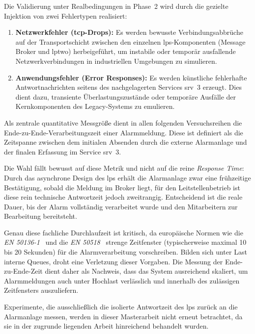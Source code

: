 Die Validierung unter Realbedingungen in Phase~2 wird durch die gezielte Injektion von zwei Fehlertypen realisiert:
\begin{enumerate}
    \item \textbf{Netzwerkfehler (\gls{tcp}-Drops):} Es werden bewusste Verbindungsabbrüche auf der Transportschicht zwischen den einzelnen \gls{lps}-Kom\-po\-nen\-ten (Message Broker und \gls{lptwo}) herbeigeführt, um instabile oder temporär ausfallende Netzwerkverbindungen in industriellen Umgebungen zu simulieren.

    \item \textbf{Anwendungsfehler (Error Responses):} Es werden künstliche fehlerhafte Antwortnachrichten seitens des nachgelagerten Services \gls{srv}~3 erzeugt. Dies dient dazu, transiente Überlastungszustände oder temporäre Ausfälle der Kernkomponenten des Legacy-Systems zu emulieren.
\end{enumerate}

Als zentrale quantitative Messgröße dient in allen folgenden Versuchsreihen die Ende-zu-Ende-Verarbeitungszeit einer Alarmmeldung. Diese ist definiert als die Zeitspanne zwischen dem initialen Absenden durch die externe Alarmanlage und der finalen Erfassung im Service \gls{srv}~3.

Die Wahl fällt bewusst auf diese Metrik und nicht auf die reine \textit{Response Time}: Durch das asynchrone Design des \gls{lps} erhält die Alarmanlage zwar eine frühzeitige Bestätigung, sobald die Meldung im Broker liegt, für den Leitstellenbetrieb ist diese rein technische Antwortzeit jedoch zweitrangig. Entscheidend ist die reale Dauer, bis der Alarm vollständig verarbeitet wurde und den Mitarbeitern zur Bearbeitung bereitsteht.

Genau diese fachliche Durchlaufzeit ist kritisch, da europäische Normen wie die \textit{EN 50136-1}~\citep{din_en_50136-12012-08_alarm_2012} und die \textit{EN 50518}~\citep{din_en_50518_2019} strenge Zeitfenster (typischerweise maximal 10 bis 20 Sekunden) für die Alarmverarbeitung vorschreiben. Bilden sich unter Last interne Queues, droht eine Verletzung dieser Vorgaben. Die Messung der Ende-zu-Ende-Zeit dient daher als Nachweis, dass das System ausreichend skaliert, um Alarmmeldungen auch unter Hochlast verlässlich und innerhalb des zulässigen Zeitfensters auszuliefern.

Experimente, die ausschließlich die isolierte Antwortzeit des \gls{lps} zurück an die Alarmanlage messen, werden in dieser Masterarbeit nicht erneut betrachtet, da sie in der zugrunde liegenden Arbeit hinreichend behandelt wurden.

